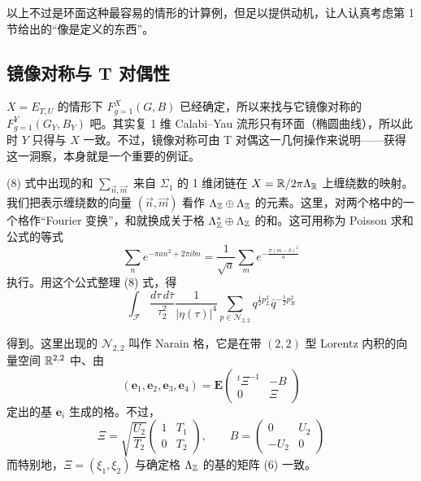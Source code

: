 以上不过是环面这种最容易的情形的计算例，但足以提供动机，让人认真考虑第 1 节给出的“像是定义的东西”。

\subsection{镜像对称与 T 对偶性}

$X=E_{T,U}$ 的情形下 $F_{g=1}^X(G,B)$ 已经确定，所以来找与它镜像对称的 $F_{g=1}^Y(G_Y,B_Y)$ 吧。其实复 1 维 Calabi--Yau 流形只有环面（椭圆曲线），所以此时 $Y$ 只得与 $X$ 一致。不过，镜像对称可由 T 对偶这一几何操作来说明——获得这一洞察，本身就是一个重要的例证。

(8) 式中出现的和 $\sum_{\vec n,\vec m}$ 来自 $\Sigma_1$ 的 1 维闭链在 $X=\mathbb{R}/2\pi\Lambda_{\mathbb{R}}$ 上缠绕数的映射。
我们把表示缠绕数的向量 $(\vec n,\vec m)$ 看作 $\Lambda_{\mathbb{Z}}\oplus\Lambda_{\mathbb{Z}}$ 的元素。这里，对两个格中的一个格作“Fourier 变换”，和就换成关于格 $\Lambda_{\mathbb{Z}}^*\oplus\Lambda_{\mathbb{Z}}$ 的和。这可用称为 Poisson 求和公式的等式
\[
  \sum_n e^{-\pi an^2+2\pi ibn}=\frac{1}{\sqrt{a}}\sum_m e^{-\frac{\pi(m-b)^2}{a}}
\]
执行。用这个公式整理 (8) 式，得
\begin{equation}
  \int_{\mathcal{F}}\frac{d\tau\,d\bar\tau}{\tau_2^2}\frac{1}{|\eta(\tau)|^4}
  \sum_{p\in\mathcal{N}_{2,2}}q^{\frac{1}{2}p_L^2}\bar q^{-\frac{1}{2}p_R^2}
  \tag{9}
\end{equation}

得到。这里出现的 $\mathcal{N}_{2,2}$ 叫作 Narain 格，它是在带 $(2,2)$ 型 Lorentz 内积的向量空间 $\mathbb{R}^{2,2}$ 中、由
\begin{equation}
  (\mathbf{e}_1,\mathbf{e}_2,\mathbf{e}_3,\mathbf{e}_4)=\mathbf{E}
  \begin{pmatrix} {}^t\Xi^{-1} & -B\\ 0 & \Xi\end{pmatrix}
  \tag{10}
\end{equation}
定出的基 $\mathbf{e}_i$ 生成的格。不过，
\[
  \Xi=\sqrt{\frac{U_2}{T_2}}
  \begin{pmatrix} 1 & T_1\\ 0 & T_2\end{pmatrix},
  \qquad
  B=\begin{pmatrix} 0 & U_2\\ -U_2 & 0\end{pmatrix}
\]
而特别地，$\Xi=(\xi_1,\xi_2)$ 与确定格 $\Lambda_{\mathbb{Z}}$ 的基的矩阵 (6) 一致。

